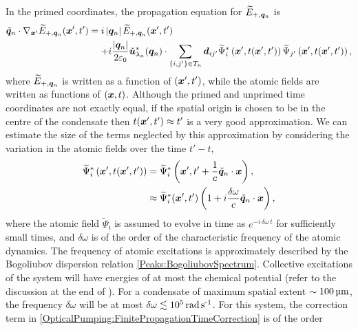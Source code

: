 In the primed coordinates, the propagation equation for $\widetilde{E}_{+, \bm{q}_n}$ is
\begin{align}
    \label{OpticalPumping:ElectricFieldSpatialPropagation}
  \begin{split}
    \unitvec{q}_n \cdot \nabla_{\vect{x}'} \widetilde{E}_{+, \vect{q}_n}(\vect{x}', t') &= i \abs{\vect{q}_n} \widetilde{E}_{+, \vect{q}_n}(\vect{x}', t')\\
    &\relphantom{=} + i \frac{\abs{\vect{q}_n}}{2 \varepsilon_0} \unitvec{u}^*_{\lambda_n}(\vect{q}_n) \cdot \sum_{\{i,j'\}\in T_n} \vect{d}_{ij'} \widetilde{\Psi}^*_i\left(\vect{x}', t(\vect{x}', t')\right) \widetilde{\Psi}_{j'}\left(\vect{x}', t(\vect{x}', t')\right),
  \end{split}
\end{align}
where $\widetilde{E}_{+, \bm{q}_n}$ is written as a function of $(\bm{x}', t')$, while the atomic fields are written as functions of $(\bm{x}, t)$.  Although the primed and unprimed time coordinates are not exactly equal, if the spatial origin is chosen to be in the centre of the condensate then $t(\bm{x}', t') \approx t'$ is a very good approximation.  We can estimate the size of the terms neglected by this approximation by considering the variation in the atomic fields over the time $t'-t$,
\begin{align}
    \widetilde{\Psi}^*_i\left(\vect{x}', t(\vect{x}', t')\right) &= \widetilde{\Psi}^*_i\left(\vect{x}', t' + \frac{1}{c} \unitvec{q}_n \cdot \vect{x} \right), \notag\\
    &\approx \widetilde{\Psi}^*_i(\vect{x}', t') \left(1 + i  \frac{\delta \omega}{c}\unitvec{q}_n \cdot \vect{x} \right), \label{OpticalPumping:FinitePropagationTimeCorrection}
\end{align}
where the atomic field $\widetilde{\Psi}_{i}$ is assumed to evolve in time as $e^{-i\, \delta\omega\, t}$ for sufficiently small times, and $\delta \omega$ is of the order of the characteristic frequency of the atomic dynamics.  The frequency of atomic excitations is approximately described by the Bogoliubov dispersion relation \eqref{Peaks:BogoliubovSpectrum}.  Collective excitations of the system will have energies of at most the chemical potential (refer to the discussion at the end of ).  For a condensate of maximum spatial extent $\sim \unit[100]{\micro m}$, the frequency $\delta \omega$ will be at most $\delta \omega\lesssim \unit[10^5]{rad\,s\textsuperscript{-1}}$.  For this system, the correction term in \eqref{OpticalPumping:FinitePropagationTimeCorrection} is of the order
